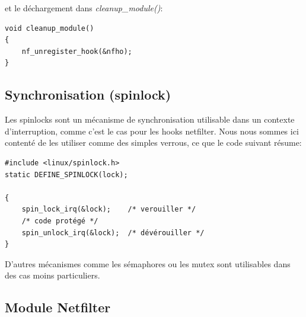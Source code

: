 \documentclass[a4paper]{article}
\begin{document}
et le déchargement dans \textit{cleanup\_module()}:
\begin{verbatim}
void cleanup_module()
{
    nf_unregister_hook(&nfho);
}
\end{verbatim}

\subsection{Synchronisation (spinlock)}
Les spinlocks sont un mécanisme de synchronisation utilisable
dans un contexte d'interruption, comme c'est le cas pour les
hooks netfilter. Nous nous sommes ici contenté de les utiliser
comme des simples verrous, ce que le code suivant résume:

\begin{verbatim}
#include <linux/spinlock.h>
static DEFINE_SPINLOCK(lock); 

{
    spin_lock_irq(&lock);    /* verouiller */
    /* code protégé */
    spin_unlock_irq(&lock);  /* dévérouiller */
}
\end{verbatim}

D'autres mécanismes comme les sémaphores ou les mutex sont
utilisables dans des cas moins particuliers.

\subsection{Module Netfilter}
\end{document}
